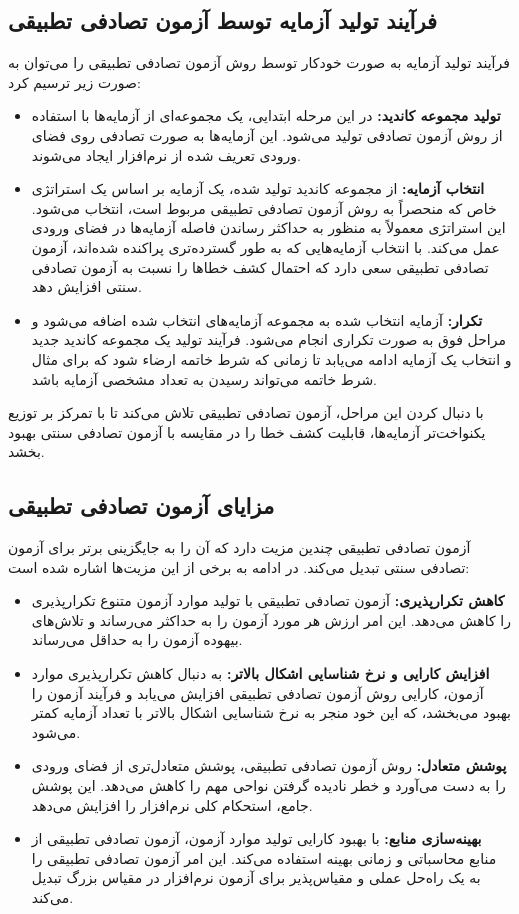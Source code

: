 \subsection{فرآیند تولید آزمایه توسط آزمون تصادفی تطبیقی}

فرآیند تولید آزمایه به صورت خودکار توسط روش آزمون تصادفی تطبیقی را می‌توان به صورت زیر ترسیم کرد:
\begin{itemize}
	\item \textbf{تولید مجموعه کاندید:} در این مرحله ابتدایی، یک مجموعه‌ای از آزمایه‌ها با استفاده از روش آزمون تصادفی تولید می‌شود. این آزمایه‌ها به صورت تصادفی روی فضای ورودی تعریف شده از نرم‌افزار ایجاد می‌شوند.
	\item \textbf{انتخاب آزمایه:} از مجموعه کاندید تولید شده، یک آزمایه بر اساس یک استراتژی خاص که منحصراً به روش آزمون تصادفی تطبیقی مربوط است، انتخاب می‌شود. این استراتژی معمولاً به منظور به حداکثر رساندن فاصله آزمایه‌ها در فضای ورودی عمل می‌کند. با انتخاب آزمایه‌هایی که به طور گسترده‌تری پراکنده شده‌اند، آزمون تصادفی تطبیقی سعی دارد که احتمال کشف خطاها را نسبت به آزمون تصادفی سنتی افزایش دهد.
	\item \textbf{تکرار:} آزمایه انتخاب شده به مجموعه آزمایه‌های انتخاب شده اضافه می‌شود و مراحل فوق به صورت تکراری انجام می‌شود. فرآیند تولید یک مجموعه کاندید جدید و انتخاب یک آزمایه ادامه می‌یابد تا زمانی که شرط خاتمه ارضاء شود که برای مثال شرط خاتمه می‌تواند رسیدن به تعداد مشخصی آزمایه باشد.
\end{itemize}
با دنبال کردن این مراحل، آزمون تصادفی تطبیقی تلاش می‌کند تا با تمرکز بر توزیع یکنواخت‌تر آزمایه‌ها، قابلیت کشف خطا را در مقایسه با آزمون تصادفی سنتی بهبود بخشد.

\subsection{مزایای آزمون تصادفی تطبیقی}
آزمون تصادفی تطبیقی چندین مزیت دارد که آن را به جایگزینی برتر برای آزمون تصادفی سنتی تبدیل می‌کند. در ادامه به برخی از این مزیت‌ها اشاره شده است:
\begin{itemize}
	\item \textbf{کاهش تکرارپذیری:} آزمون تصادفی تطبیقی با تولید موارد آزمون متنوع تکرارپذیری را کاهش می‌دهد. این امر ارزش هر مورد آزمون را به حداکثر می‌رساند و تلاش‌های بیهوده آزمون را به حداقل می‌رساند.
	\item \textbf{افزایش کارایی و نرخ شناسایی اشکال بالاتر:}‌ به دنبال کاهش تکرارپذیری موارد آزمون، کارایی روش آزمون تصادفی تطبیقی افزایش می‌یابد و فرآیند آزمون را بهبود می‌بخشد، که این خود منجر به نرخ شناسایی اشکال بالاتر با تعداد آزمایه کمتر می‌شود.
	\item \textbf{پوشش متعادل:} روش آزمون تصادفی تطبیقی، پوشش متعادل‌تری از فضای ورودی را به دست می‌آورد و خطر نادیده گرفتن نواحی مهم را کاهش می‌دهد. این پوشش جامع، استحکام کلی نرم‌افزار را افزایش می‌دهد.
	\item \textbf{بهینه‌سازی منابع:} با بهبود کارایی تولید موارد آزمون، آزمون تصادفی تطبیقی از منابع محاسباتی و زمانی بهینه استفاده می‌کند. این امر آزمون تصادفی تطبیقی را به یک راه‌حل عملی و مقیاس‌پذیر برای آزمون نرم‌افزار در مقیاس بزرگ تبدیل می‌کند.
\end{itemize}


